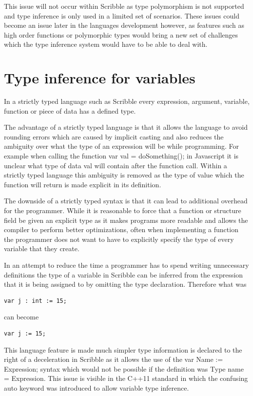 \documentclass[]{final_report}
\begin{document}
This issue will not occur within Scribble as type polymorphism is not supported and type inference is only used in a limited set of scenarios. These issues could become an issue later in the languages development however, as features such as high order functions or polymorphic types would bring a new set of challenges which the type inference system would have to be able to deal with.

\section{Type inference for variables}

In a strictly typed language such as Scribble every expression, argument, variable, function or piece of data has a defined type.

The advantage of a strictly typed language is that it allows the language to avoid rounding errors which are caused by implicit casting and also reduces the ambiguity over what the type of an expression will be while programming. For example when calling the function var val = doSomething(); in Javascript it is unclear what type of data val will contain after the function call. Within a strictly typed language this ambiguity is removed as the type of value which the function will return is made explicit in its definition.

The downside of a strictly typed syntax is that it can lead to additional overhead for the programmer. While it is reasonable to force that a function or structure field be given an explicit type as it makes programs more readable and allows the compiler to perform better optimizations, often when implementing a function the programmer does not want to have to explicitly specify the type of every variable that they create.

In an attempt to reduce the time a programmer has to spend writing unnecessary definitions the type of a variable in Scribble can be inferred from the expression that it is being assigned to by omitting the type declaration. Therefore what was 

\begin{verbatim}
var j : int := 15;
\end{verbatim}
can become \begin{verbatim}
var j := 15;
\end{verbatim}

This language feature is made much simpler type information is declared to the right of a deceleration in Scribble as it allows the use of the var Name := Expression; syntax which would not be possible if the definition was Type name = Expression. This issue is visible in the C++11 standard in which the confusing auto keyword was introduced to allow variable type inference.
\end{document}
